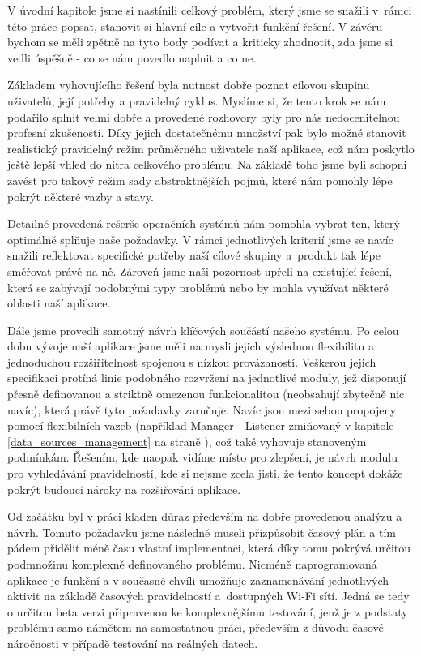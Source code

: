 \documentclass[thesis=M,czech]{FITthesis}[2012/06/26]
\begin{document}
\begin{conclusion}
V úvodní kapitole jsme si nastínili celkový problém, který jsme se snažili v~rámci této práce popsat, stanovit si hlavní cíle a vytvořit funkční řešení. V závěru bychom se měli zpětně na tyto body podívat a kriticky zhodnotit, zda jsme si vedli úspěšně - co se nám povedlo naplnit a co ne.

Základem vyhovujícího řešení byla nutnost dobře poznat cílovou skupinu uživatelů, její potřeby a pravidelný cyklus. Myslíme si, že tento krok se nám podařilo splnit velmi dobře a provedené rozhovory byly pro nás nedocenitelnou profesní zkušeností. Díky jejich dostatečnému množství pak bylo možné stanovit realistický pravidelný režim průměrného uživatele naší aplikace, což nám poskytlo ještě lepší vhled do nitra celkového problému. Na základě toho jsme byli schopni zavést pro takový režim sady abstraktnějších pojmů, které nám pomohly lépe pokrýt některé vazby a stavy.

Detailně provedená rešerše operačních systémů nám pomohla vybrat ten, který optimálně splňuje naše požadavky. V rámci jednotlivých kriterií jsme se navíc snažili reflektovat specifické potřeby naší cílové skupiny a~produkt tak lépe směřovat právě na ně. Zároveň jsme naši pozornost upřeli na existující řešení, která se zabývají podobnými typy problémů nebo by mohla využívat některé oblasti naší aplikace.

Dále jsme provedli samotný návrh klíčových součástí našeho systému. Po celou dobu vývoje naší aplikace jsme měli na mysli jejich výslednou flexibilitu a jednoduchou rozšiřitelnost spojenou s nízkou provázaností. Veškerou jejich specifikaci protíná linie podobného rozvržení na jednotlivé moduly, jež disponují přesně definovanou a striktně omezenou funkcionalitou (neobsahují zbytečně nic navíc), která právě tyto požadavky zaručuje. Navíc jsou mezi sebou propojeny pomocí flexibilních vazeb (například Manager - Listener zmiňovaný v kapitole \ref{data_sources_management} na straně \pageref{data_sources_management}), což také vyhovuje stanoveným podmínkám. Řešením, kde naopak vidíme místo pro zlepšení, je návrh modulu pro vyhledávání pravidelností, kde si nejsme zcela jisti, že tento koncept dokáže pokrýt budoucí nároky na rozšiřování aplikace.

Od začátku byl v práci kladen důraz především na dobře provedenou analýzu a návrh. Tomuto požadavku jsme následně museli přizpůsobit časový plán a tím pádem přidělit méně času vlastní implementaci, která díky tomu pokrývá určitou podmnožinu komplexně definovaného problému. Nicméně naprogramovaná aplikace je funkční a v současné chvíli umožňuje zaznamenávání jednotlivých aktivit na základě časových pravidelností a~dostupných Wi-Fi sítí. Jedná se tedy o určitou beta verzi připravenou ke komplexnějšímu testování, jenž je z podstaty problému samo námětem na samostatnou práci, především z důvodu časové náročnosti v případě testování na reálných datech.
\end{conclusion}
\end{document}
